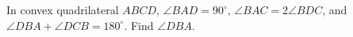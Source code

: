 In convex quadrilateral $ABCD$, $\angle BAD=90^\circ$, $\angle BAC=2\angle BDC$, and $\angle DBA+\angle DCB=180^\circ$. Find $\angle DBA$.
